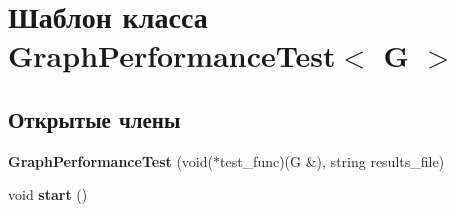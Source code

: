 \hypertarget{class_graph_performance_test}{}\section{Шаблон класса Graph\+Performance\+Test$<$ G $>$}
\label{class_graph_performance_test}
\subsection*{Открытые члены}
\begin{DoxyCompactItemize}
\item 
\mbox{\label{class_graph_performance_test_a51b3b8479660b36be84e608549391244}} 
{\bfseries Graph\+Performance\+Test} (void($\ast$test\+\_\+func)(G \&), string results\+\_\+file)
\item 
\mbox{\label{class_graph_performance_test_a4b8bbf9ae4678e78d4c9a0dc938df598}} 
void {\bfseries start} ()
\end{DoxyCompactItemize}
